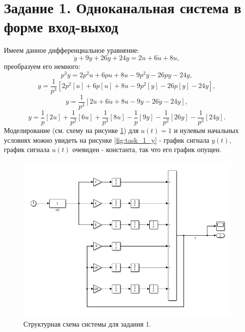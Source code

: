 \section*{Задание 1. Одноканальная система в форме вход-выход}

Имеем данное дифференциальное уравнение:
\begin{equation*}
    \dddot y + 9\ddot y + 26\dot y + 24 y = 2\ddot u +6\dot u +8 u,
\end{equation*}
преобразуем его немного:
\begin{equation*}
    p^3y=2p^2u+6pu+8u-9p^2y-26py-24y,
\end{equation*}
\begin{equation*}
    y=\frac{1}{p^3}[2p^2[u]+6p[u]+8u-9p^2[y]-26p[y]-24y],
\end{equation*}
\begin{equation*}
    y=\frac{1}{p^3}[2\ddot u+6\dot u+8u-9\ddot y-26\dot y-24y],
\end{equation*}
\begin{equation*}
    y=\frac{1}{p}[2u]+\frac{1}{p^2}[6u]+\frac{1}{p^3}[8u]-\frac{1}{p}[9y]-\frac{1}{p^2}[26y]-\frac{1}{p^3}[24y].
\end{equation*}
Моделирование (см. схему на рисунке \ref{fig:task_1_slx}) для $u(t)=1$ и 
нулевым начальных условиях можно увидеть на рисунке \ref{fig:task_1_y} - график сигнала $y(t)$,
график сигнала $u(t)$ очевиден - константа, так что его график опущен.

\begin{figure}[htbp]
    \centering
    \includegraphics[width=\linewidth]{figs/task_1_slx.png}
    \caption{Структурная схема системы для задания 1.}
    \label{fig:task_1_slx}
\end{figure}

